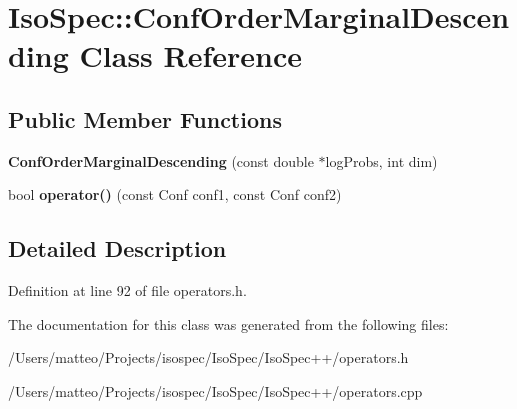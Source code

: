 \hypertarget{class_iso_spec_1_1_conf_order_marginal_descending}{}\section{Iso\+Spec\+:\+:Conf\+Order\+Marginal\+Descending Class Reference}
\label{class_iso_spec_1_1_conf_order_marginal_descending}
\subsection*{Public Member Functions}
\begin{DoxyCompactItemize}
\item 
\mbox{\label{class_iso_spec_1_1_conf_order_marginal_descending_a331cca614490a25d2bf4d48e04a1eba3}} 
{\bfseries Conf\+Order\+Marginal\+Descending} (const double $\ast$log\+Probs, int dim)
\item 
\mbox{\label{class_iso_spec_1_1_conf_order_marginal_descending_ab393a338e6a2dedb75d4cc84b54ca1f1}} 
bool {\bfseries operator()} (const Conf conf1, const Conf conf2)
\end{DoxyCompactItemize}


\subsection{Detailed Description}


Definition at line 92 of file operators.\+h.



The documentation for this class was generated from the following files\+:\begin{DoxyCompactItemize}
\item 
/\+Users/matteo/\+Projects/isospec/\+Iso\+Spec/\+Iso\+Spec++/operators.\+h\item 
/\+Users/matteo/\+Projects/isospec/\+Iso\+Spec/\+Iso\+Spec++/operators.\+cpp\end{DoxyCompactItemize}

